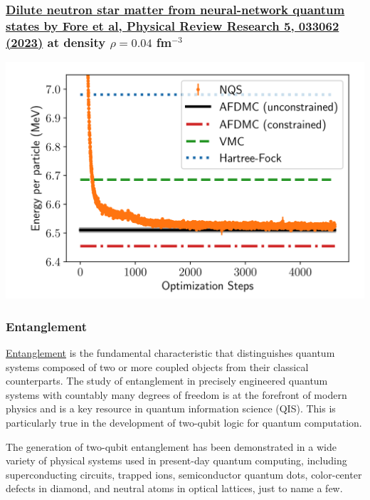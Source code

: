 \documentclass{beamer}
\begin{document}
\begin{frame}
\frametitle{\href{{https://journals.aps.org/prresearch/pdf/10.1103/PhysRevResearch.5.033062}}{Dilute neutron star matter from neural-network quantum states by Fore et al, Physical Review Research 5, 033062 (2023)} at density $\rho=0.04$ fm$^{-3}$}

\begin{block}{}

\vspace{6mm}

\centerline{\includegraphics[width=0.9\linewidth]{qcfigures/nmatter.png}}

\vspace{6mm}

\end{block}
\end{frame}

\begin{frame}
\frametitle{Entanglement}

\begin{block}{}
\href{{https://link.springer.com/content/pdf/10.1007/s11232-007-0098-9.pdf}}{Entanglement} is the fundamental characteristic that distinguishes
quantum systems composed of two or more coupled objects from their
classical counterparts. The study of entanglement in precisely
engineered quantum systems with countably many degrees of freedom is
at the forefront of modern physics and is a key resource in quantum
information science (QIS). This is particularly true in the
development of two-qubit logic for quantum computation.
\end{block}

\begin{block}{}
The
generation of two-qubit entanglement has been demonstrated in a wide
variety of physical systems used in present-day quantum computing,
including superconducting circuits, trapped
ions, semiconductor quantum dots, color-center
defects in diamond, and neutral atoms in optical
lattices, just to name a few.
\end{block}
\end{frame}
\end{document}
